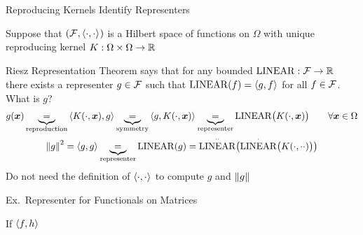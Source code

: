 \documentclass[10pt,compress,xcolor={usenames,dvipsnames},aspectratio=169]{beamer}
\DeclareMathOperator{\LIN}{LINEAR}
\begin{document}
\begin{frame}{Reproducing Kernels Identify Representers}

\vspace{-4ex}
	Suppose that  $(\mathcal{F},\left \langle \cdot, \cdot \right \rangle_{{}})$  is a Hilbert space of functions on $\Omega$ with \alert{unique reproducing kernel}  $K: \Omega \times \Omega \to \mathbb{R}$ 
	
Riesz Representation Theorem says that for any bounded $\LIN : \cf \to \reals$ there exists a \alert{representer} $g \in \mathcal{F}$ such that $\LIN(f)  =  \ip{g}{f} $ for all $f \in \mathcal{F}$.  \alert{What is $g$?}
\begin{gather*}
	g(\vx) \underbrace{=}_{\text{reproduction}} \ip{K(\cdot,\vx)}{g} \underbrace{=}_{\text{symmetry}}  \ip{g}{K(\cdot,\vx)} \underbrace{=}_{\text{representer}} \LIN\bigl(K(\cdot,\vx)\bigr) \qquad \forall \vx \in \Omega\\
		\norm{g}^2 = \ip{g}{g} \underbrace{=}_{\text{representer}} \LIN(g) = \LIN^{\cdot\cdot} \bigl( \LIN^\cdot\bigl(K(\cdot,\cdot \cdot)\bigr)   \bigr)
\end{gather*}
\vspace{-3ex}
\alert{Do not} need the definition of $\left \langle \cdot, \cdot \right \rangle_{{}}$ to compute $g$ and $\left \lVert g \right \rVert_{{}}$

\end{frame}


\begin{frame}{Ex.\ Representer for Functionals on Matrices}

If $\left \langle f, h \right \rangle_{{}}$

\end{frame}
\end{document}
